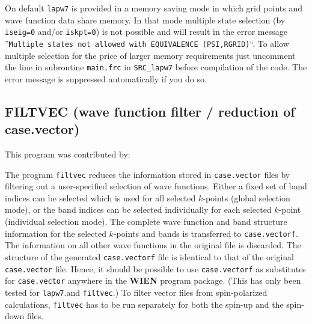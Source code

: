 \documentclass[10pt,fleqn,a4paper,twosided]{article}
\begin{document}
On default {\tt lapw7} is provided in a memory saving mode in which 
grid points and wave function data share memory. In that mode multiple
state selection (by {\tt iseig=0} and/or {\tt iskpt=0}) is not possible
and will result in the error
message ''{\tt Multiple states not allowed with EQUIVALENCE (PSI,RGRID)}``.
To allow multiple selection for the price of larger memory requirements
just uncomment the line\newline
\hspace*{1cm}{\tt EQUIVALENCE (PSI,RGRID)}\newline
in subroutine {\tt main.frc} in {\tt SRC\_lapw7} before compilation of the
code. The error message is suppressed automatically if you do so.



\subsection{FILTVEC (wave function filter / reduction of case.vector)}
\vspace*{.5cm}

This program was contributed by:

\vspace*{.5cm}
\hspace*{1.5cm}
\vspace*{.75cm}

The program {\tt filtvec} reduces the information stored in 
{\tt case.vector} files by filtering out a user-specified selection of 
wave functions. Either a fixed set of band indices can be selected which is 
used for all selected $k$-points (global selection mode), or the band
indices can be selected individually for each selected $k$-point
(individual selection mode).
The complete wave function and band structure information for the 
selected $k$-points and bands is transferred to {\tt case.vectorf}.
The information on all other wave functions in the original file is 
discarded. The structure of the generated {\tt case.vectorf} file is 
identical to that of the original {\tt case.vector} file. Hence, it should 
be possible to use {\tt case.vectorf} as substitutes for {\tt case.vector} 
anywhere in the {\bf WIEN} program package. (This has only been tested for 
{\tt lapw7}.and {\tt filtvec}.)
To filter vector files from spin-polarized calculations, {\tt filtvec}
has to be run separately for both the spin-up and the spin-down files.
\end{document}
